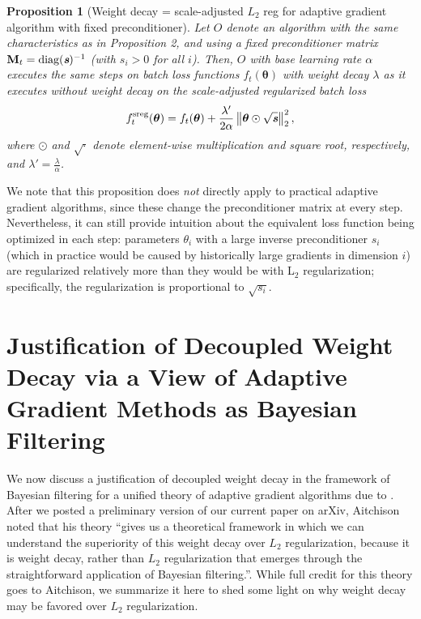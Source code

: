 \documentclass[usenames,dvipsnames]{article}
\newcommand{\norm}[1]{\left\lVert#1\right\rVert}
\newtheorem{prop}{Proposition}
\newcommand{\vc}[1]{\textit{\textbf{#1}}}
\begin{document}
\begin{prop}[Weight decay = scale-adjusted $L_2$ reg for adaptive gradient algorithm with fixed preconditioner]
Let $O$ denote an algorithm with the same characteristics as in Proposition 2, and using a fixed preconditioner matrix $\textbf{M}_t = \text{diag}(\vc{s})^{-1}$ (with $s_i>0$ for all $i$).
Then, $O$ with base learning rate $\alpha$ executes the same steps on batch loss functions $f_t(\bm{\theta})$ with weight decay $\lambda$ as it executes without weight decay on the scale-adjusted regularized batch loss 
\vspace*{-0.2cm}
\begin{equation}f_{t}^{\text{sreg}}(\bm{\theta}) = f_t(\bm{\theta}) + \frac{\lambda'}{2\alpha} \norm{\bm{\theta} \odot{} \sqrt{\vc{s}}}_2^2,\vspace*{-0.1cm}
\end{equation}
where $\odot$ and $\sqrt{\cdot}$ denote element-wise multiplication and square root, respectively, and $\lambda' = \frac{\lambda}{\alpha}$.
\end{prop}

We note that this proposition does \emph{not} directly apply to practical adaptive gradient algorithms, since these change the preconditioner matrix at every step. Nevertheless, it can still provide intuition about the equivalent loss function being optimized in each step: parameters $\theta_i$ with a large inverse preconditioner $s_i$ (which in practice would be caused by historically large gradients in dimension $i$) are regularized relatively more than they would be with L$_2$ regularization; specifically, the regularization is proportional to $\sqrt{s_i}$. 

\section{Justification of Decoupled Weight Decay via a View of Adaptive Gradient Methods as Bayesian Filtering}
\label{sec:justification}

We now discuss a justification of decoupled weight decay in the framework of Bayesian filtering for a unified theory of adaptive gradient algorithms due to \citet{aitchison18}.
After we posted a preliminary version of our current paper on arXiv, Aitchison noted that his theory ``gives us a theoretical framework in which we can understand the superiority of this weight decay over $L_2$ regularization, because it is weight decay, rather than $L_2$ regularization that emerges through the straightforward application of Bayesian filtering.''\citep{aitchison18}.
While full credit for this theory goes to Aitchison, we summarize it here to shed some light on why weight decay may be favored over $L_2$ regularization.
\end{document}
